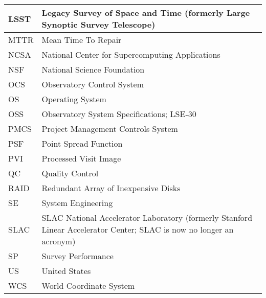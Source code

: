 \begin{longtable}{p{}p{}}
LSST & Legacy Survey of Space and Time (formerly Large Synoptic Survey Telescope) \\\hline
MTTR & Mean Time To Repair \\\hline
NCSA & National Center for Supercomputing Applications \\\hline
NSF & National Science Foundation \\\hline
OCS & Observatory Control System \\\hline
OS & Operating System \\\hline
OSS & Observatory System Specifications; LSE-30 \\\hline
PMCS & Project Management Controls System \\\hline
PSF & Point Spread Function \\\hline
PVI & Processed Visit Image \\\hline
QC & Quality Control \\\hline
RAID & Redundant Array of Inexpensive Disks \\\hline
SE & System Engineering \\\hline
SLAC & SLAC National Accelerator Laboratory (formerly Stanford Linear Accelerator Center; SLAC is now no longer an acronym) \\\hline
SP & Survey Performance \\\hline
US & United States \\\hline
WCS & World Coordinate System \\\hline
\end{longtable}
